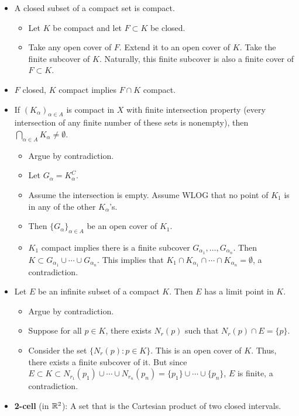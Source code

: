 \documentclass[../../notes.tex]{subfiles}
\begin{document}
\begin{itemize}
    \item A closed subset of a compact set is compact.
    \begin{itemize}
        \item Let $K$ be compact and let $F\subset K$ be closed.
        \item Take any open cover of $F$. Extend it to an open cover of $K$. Take the finite subcover of $K$. Naturally, this finite subcover is also a finite cover of $F\subset K$.
    \end{itemize}
    \item $F$ closed, $K$ compact implies $F\cap K$ compact.
    \item If $(K_\alpha)_{\alpha\in A}$ is compact in $X$ with finite intersection property (every intersection of any finite number of these sets is nonempty), then $\bigcap_{\alpha\in A}K_\alpha\neq\emptyset$.
    \begin{itemize}
        \item Argue by contradiction.
        \item Let $G_\alpha=K_\alpha^C$.
        \item Assume the intersection is empty. Assume WLOG that no point of $K_1$ is in any of the other $K_\alpha$'s.
        \item Then $\{G_\alpha\}_{\alpha\in A}$ be an open cover of $K_1$.
        \item $K_1$ compact implies there is a finite subcover $G_{\alpha_1},\dots,G_{\alpha_n}$. Then $K\subset G_{\alpha_1}\cup\cdots\cup G_{\alpha_n}$. This implies that $K_1\cap K_{\alpha_1}\cap\cdots\cap K_{\alpha_n}=\emptyset$, a contradiction.
    \end{itemize}
    \item Let $E$ be an infinite subset of a compact $K$. Then $E$ has a limit point in $K$.
    \begin{itemize}
        \item Argue by contradiction.
        \item Suppose for all $p\in K$, there exists $N_r(p)$ such that $N_r(p)\cap E=\{p\}$.
        \item Consider the set $\{N_r(p):p\in K\}$. This is an open cover of $K$. Thus, there exists a finite subcover of it. But since $E\subset K\subset N_{r_1}(p_1)\cup\cdots\cup N_{r_n}(p_n)=\{p_1\}\cup\cdots\cup\{p_n\}$, $E$ is finite, a contradiction.
    \end{itemize}
    \item \textbf{2-cell} (in $\mathbb{R}^2$): A set that is the Cartesian product of two closed intervals.
    \begin{figure}[h!]
        \centering
\end{figure}
\end{itemize}
\end{document}
